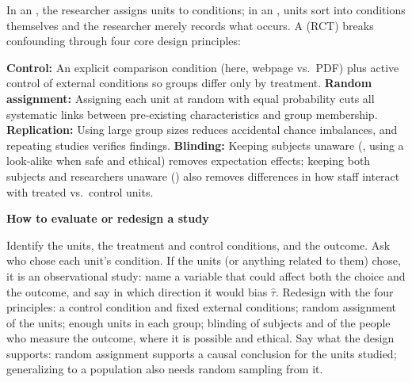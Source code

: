 \documentclass[10pt]{scrartcl}
\newenvironment{howto}[1]{\begin{mdframed}[style=howtostyle]{\color{NavyBlue}\textbf{#1}}\par\vspace{2pt}}{\end{mdframed}}
\begin{document}
In an , the researcher assigns units to conditions; in an , units sort into conditions themselves and the researcher merely records what occurs. A  (RCT) breaks confounding through four core design principles:
\begin{itemize}
  \ii \textbf{Control:} An explicit comparison condition (here, webpage vs.\ PDF) plus active control of external conditions so groups differ only by treatment.
  \ii \textbf{Random assignment:} Assigning each unit at random with equal probability cuts all systematic links between pre-existing characteristics and group membership.
  \ii \textbf{Replication:} Using large group sizes reduces accidental chance imbalances, and repeating studies verifies findings.
  \ii \textbf{Blinding:} Keeping subjects unaware (, using a look-alike  when safe and ethical) removes expectation effects; keeping both subjects and researchers unaware () also removes differences in how staff interact with treated vs.\ control units.
\end{itemize}

\begin{howto}{How to evaluate or redesign a study}
\begin{steps}
  \ii Identify the units, the treatment and control conditions, and the outcome.
  \ii Ask who chose each unit's condition. If the units (or anything related to them) chose, it is an observational study: name a variable that could affect both the choice and the outcome, and say in which direction it would bias $\hat\tau$.
  \ii Redesign with the four principles: a control condition and fixed external conditions; random assignment of the units; enough units in each group; blinding of subjects and of the people who measure the outcome, where it is possible and ethical.
  \ii Say what the design supports: random assignment supports a causal conclusion for the units studied; generalizing to a population also needs random sampling from it.
\end{steps}
\end{howto}
\end{document}
